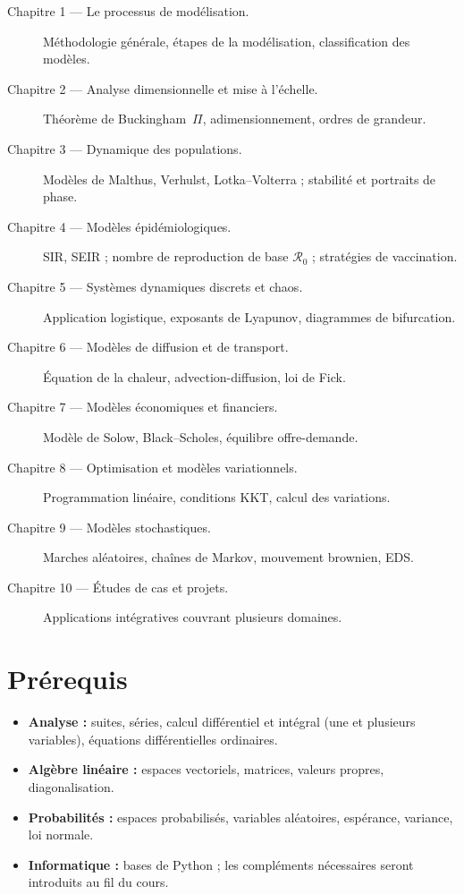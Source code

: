 \begin{description}
  \item[Chapitre 1 --- Le processus de mod\'elisation.]
    M\'ethodologie g\'en\'erale, \'etapes de la mod\'elisation, classification
    des mod\`eles.
  \item[Chapitre 2 --- Analyse dimensionnelle et mise \`a l'\'echelle.]
    Th\'eor\`eme de Buckingham~$\Pi$, adimensionnement, ordres de grandeur.
  \item[Chapitre 3 --- Dynamique des populations.]
    Mod\`eles de Malthus, Verhulst, Lotka--Volterra ; stabilit\'e et portraits
    de phase.
  \item[Chapitre 4 --- Mod\`eles \'epid\'emiologiques.]
    SIR, SEIR ; nombre de reproduction de base $\mathcal{R}_0$ ;
    strat\'egies de vaccination.
  \item[Chapitre 5 --- Syst\`emes dynamiques discrets et chaos.]
    Application logistique, exposants de Lyapunov, diagrammes de bifurcation.
  \item[Chapitre 6 --- Mod\`eles de diffusion et de transport.]
    \'Equation de la chaleur, advection-diffusion, loi de Fick.
  \item[Chapitre 7 --- Mod\`eles \'economiques et financiers.]
    Mod\`ele de Solow, Black--Scholes, \'equilibre offre-demande.
  \item[Chapitre 8 --- Optimisation et mod\`eles variationnels.]
    Programmation lin\'eaire, conditions KKT, calcul des variations.
  \item[Chapitre 9 --- Mod\`eles stochastiques.]
    Marches al\'eatoires, cha\^ines de Markov, mouvement brownien, EDS.
  \item[Chapitre 10 --- \'Etudes de cas et projets.]
    Applications int\'egratives couvrant plusieurs domaines.
\end{description}

\section*{Pr\'erequis}

\begin{itemize}
  \item \textbf{Analyse :} suites, s\'eries, calcul diff\'erentiel et int\'egral
        (une et plusieurs variables), \'equations diff\'erentielles ordinaires.
  \item \textbf{Alg\`ebre lin\'eaire :} espaces vectoriels, matrices,
        valeurs propres, diagonalisation.
  \item \textbf{Probabilit\'es :} espaces probabilis\'es, variables al\'eatoires,
        esp\'erance, variance, loi normale.
  \item \textbf{Informatique :} bases de Python ; les compl\'ements
        n\'ecessaires seront introduits au fil du cours.
\end{itemize}

